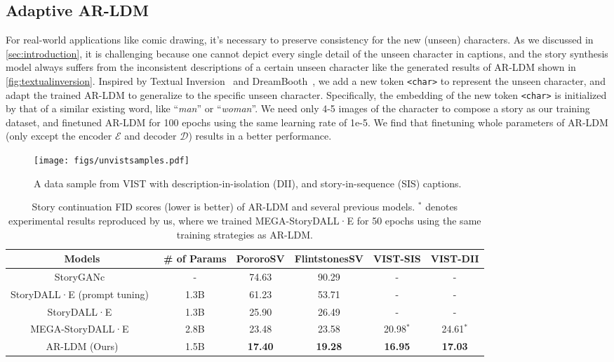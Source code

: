 \documentclass[10pt,twocolumn,letterpaper]{article}
\begin{document}
\subsection{Adaptive AR-LDM}
\label{sec:unseen_character_adaptation}
For real-world applications like comic drawing, it's necessary to preserve consistency for the new (unseen) characters. As we discussed in \cref{sec:introduction}, it is challenging because one cannot depict every single detail of the unseen character in captions, and the story synthesis model always suffers from the inconsistent descriptions of a certain unseen character like the generated results of AR-LDM shown in \cref{fig:textualinversion}. Inspired by Textual Inversion~\cite{textualinversion} and DreamBooth~\cite{dreambooth}, we add a new token \texttt{<char>} to represent the unseen character, and adapt the trained AR-LDM to generalize to the specific unseen character. Specifically, the embedding of the new token \texttt{<char>} is initialized by that of a similar existing word, like ``\textit{man}'' or ``\textit{woman}''. We need only 4-5 images of the character to compose a story as our training dataset, and finetuned AR-LDM for 100 epochs using the same learning rate of 1e-5. We find that finetuning whole parameters of AR-LDM (only except the encoder $\mathcal{E}$ and decoder $\mathcal{D}$) results in a better performance.


\begin{figure}[!t]
    \centering
    \texttt{[image: figs/unvistsamples.pdf]}
    \caption{A data sample from VIST with description-in-isolation (DII), and story-in-sequence (SIS) captions.}
    \label{fig:vistsamples}
\end{figure}

\begin{table*}[t]
\small
\centering
\setlength\tabcolsep{12pt}
\begin{tabularx}{\linewidth}{cccccc}
    \toprule
    Models & \# of Params & PororoSV & FlintstonesSV & VIST-SIS & VIST-DII \\
    \midrule
    StoryGANc~\cite{storydalle} & - & 74.63 & 90.29 & - & - \\
    StoryDALL·E (prompt tuning)~\cite{storydalle} & 1.3B & 61.23 & 53.71 & - & - \\
    StoryDALL·E~\cite{storydalle} & 1.3B & 25.90 & 26.49 & - & - \\
    MEGA-StoryDALL·E~\cite{storydalle} & 2.8B & 23.48 & 23.58 & 20.98$^{*}$ & 24.61$^{*}$ \\
    AR-LDM (Ours) & 1.5B & \textbf{17.40} & \textbf{19.28} & \textbf{16.95} & \textbf{17.03} \\
    \bottomrule
    \end{tabularx}
\caption{Story continuation FID scores (lower is better) of AR-LDM and several previous models. $^{*}$ denotes experimental results reproduced by us, where we trained MEGA-StoryDALL·E for 50 epochs using the same training strategies as AR-LDM.}
\label{tb:continuationfid}
\vspace{-8pt}
\end{table*}
\end{document}
